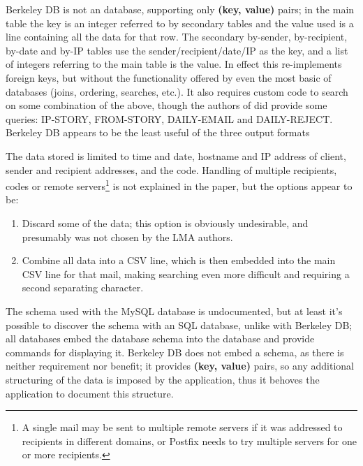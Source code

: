 \documentclass[a4paper,12pt,draft]{article}
\begin{document}
Berkeley DB is not an \SQL{} database, supporting only \textbf{(key,
value)} pairs; in the main table the key is an integer referred to by
secondary tables and the value used is a \CSV{} line containing all the
data for that row.  The secondary by-sender, by-recipient, by-date and
by-IP tables use the sender/recipient/date/IP as the key, and a \CSV{} list
of integers referring to the main table is the value.  In effect this
re-implements \SQL{} foreign keys, but without the functionality offered by
even the most basic of \SQL{} databases (joins, ordering, searches, etc.).
It also requires custom code to search on some combination of the above,
though the authors of \LMA{} did provide some queries: IP-STORY,
FROM-STORY, DAILY-EMAIL and DAILY-REJECT\@.  Berkeley DB appears to be the
least useful of the three output formats

The data stored is limited to time and date, hostname and IP address of
client, sender and recipient addresses, and the \SMTP{} code.  Handling of
multiple recipients, \SMTP{} codes or remote servers\footnote{A single mail
may be sent to multiple remote servers if it was addressed to recipients in
different domains, or Postfix needs to try multiple servers for one or more
recipients.} is not explained in the paper, but the options appear to be:

\begin{enumerate}

    \item Discard some of the data; this option is obviously undesirable,
        and presumably was not chosen by the LMA authors.

    \item Combine all data into a CSV line, which is then embedded into the
        main CSV line for that mail, making searching even more difficult
        and requiring a second separating character.

\end{enumerate}

The schema used with the MySQL database is undocumented, but at least it's
possible to discover the schema with an SQL database, unlike with Berkeley
DB\@; all \SQL{} databases embed the database schema into the database and
provide commands for displaying it.  Berkeley DB does not embed a schema,
as there is neither requirement nor benefit; it provides \textbf{(key,
value)} pairs, so any additional structuring of the data is imposed by the
application, thus it behoves the application to document this structure.
\end{document}

